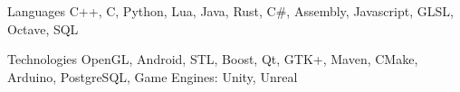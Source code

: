 


\begin{cvskills}


\cvskill
{Languages} %
{C++, C, Python, Lua, Java, Rust, C\#, Assembly, Javascript, GLSL, Octave, SQL } %


\cvskill
{Technologies}
{OpenGL, Android, STL, Boost, Qt, GTK+, Maven, CMake, Arduino, PostgreSQL, Game Engines: Unity, Unreal}



\end{cvskills}

